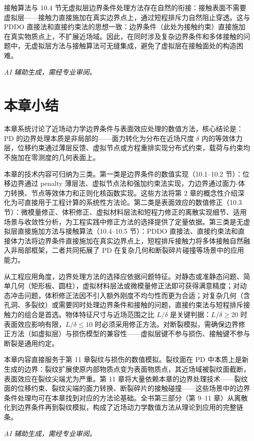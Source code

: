接触算法与 10.4 节无虚拟层边界条件处理方法存在自然的衔接：接触表面不需要虚拟层——接触力直接施加在真实边界点上，通过短程排斥力自然阻止穿透。这与 PDDO 直接法和直接约束法的思想一致：边界条件（此处为接触约束）直接施加在真实物质点上，不扩展近场域。因此，在同时涉及复杂边界条件和多体接触的问题中，无虚拟层方法与接触算法可无缝集成，避免了虚拟层在接触面处的构造困难。

\emph{AI 辅助生成，需经专业审阅。}


\section{本章小结}

本章系统讨论了近场动力学边界条件与表面效应处理的数值方法，核心结论是：PD 的边界处理本质是非局部的——面力转化为分布在近场尺度 $\delta$ 内的等效体力层，位移约束通过薄层反馈、虚拟节点或方程重排实现分布式约束，载荷与约束均不施加在零测度的几何表面上。

本章的技术内容可归纳为三类。第一类是边界条件的数值实现（10.1--10.2 节）：位移边界通过 penalty 薄层法、虚拟节点法和强加约束法实现，力边界通过面力-体力转换、节点等效体力和正则化核函数实现。这些方法将第 2 章的概念性介绍深化为可直接用于工程计算的系统性方法论。第二类是表面效应的数值修正（10.3 节）：微模量修正、体积修正、虚拟材料层法和短程力修正的离散实现细节、适用场景与收敛性分析，为工程实践中修正方法的选择提供了定量依据。第三类是无虚拟层直接施加方法与接触算法（10.4--10.5 节）：PDDO 直接法、直接约束法和直接体力法将边界条件直接施加在真实边界点上，短程排斥接触力将多体接触自然融入非局部框架，二者共同拓展了 PD 在复杂几何和断裂碎片碰撞等场景中的应用能力。

从工程应用角度，边界处理方法的选择应依据问题特征。对静态或准静态问题、简单几何（矩形板、圆柱），虚拟材料层法或微模量修正法即可获得满意精度；对动态冲击问题，体积修正法因不引入额外刚度不均匀性而更为合适；对复杂几何（含孔洞、多裂纹）或需要同时处理边界条件和接触的问题，直接约束法与短程排斥接触力的组合是首选。物体特征尺寸与近场范围之比 $L/\delta$ 是关键判据：$L/\delta\ge 20$ 时表面效应影响有限，$L/\delta\le 10$ 时必须采用修正方法。对断裂模拟，需确保边界修正方法（如虚拟层）与损伤模型的兼容性——虚拟层键不参与损伤、接触键不参与断裂是通用约定。

本章内容直接服务于第 11 章裂纹与损伤的数值模拟。裂纹面在 PD 中本质上是新生成的边界：裂纹扩展使原内部物质点变为表面物质点，其近场域被裂纹面截断，表面效应在裂纹尖端尤为严重。第 11 章将大量依赖本章的边界处理技术——裂纹面的位移约束、裂纹尖端的面力转换、断裂碎片的接触碰撞——这些场景中的边界条件处理均可在本章找到对应的方法论基础。全书第三部分（第 9--11 章）从离散化到边界条件再到裂纹模拟，构成了近场动力学数值方法从理论到应用的完整链条。

\emph{AI 辅助生成，需经专业审阅。}

